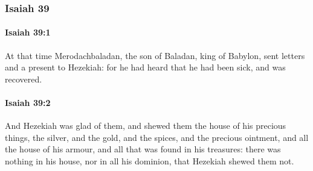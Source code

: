 	\subsubsection{Isaiah 39} %
		\label{ISAIAH-39}

		\paragraph{Isaiah 39:1} %
			\label{ISAIAH-39-1}

			At that time Merodachbaladan, the son of Baladan, king of Babylon, sent letters and a present to Hezekiah: for he had heard that he had been sick, and was recovered.


		\paragraph{Isaiah 39:2} %
			\label{ISAIAH-39-2}

			And Hezekiah was glad of them, and shewed them the house of his precious things, the silver, and the gold, and the spices, and the precious ointment, and all the house of his armour, and all that was found in his treasures: there was nothing in his house, nor in all his dominion, that Hezekiah shewed them not.

